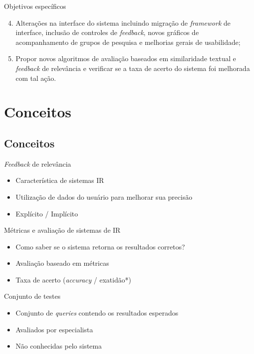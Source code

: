 \documentclass{beamer}
\begin{document}
\begin{frame}{Objetivos específicos}
  \begin{enumerate}[<+->]
    \setcounter{enumi}{3}

    \item Alterações na interface do sistema incluindo migração de \textit{framework} de interface, inclusão de controles de \textit{feedback}, novos gráficos de acompanhamento de grupos de pesquisa e melhorias gerais de usabilidade;

    \item Propor novos algoritmos de avaliação baseados em similaridade textual e \textit{feedback} de relevância e verificar se a taxa de acerto do sistema foi melhorada com tal ação.
  \end{enumerate}
\end{frame}

\section{Conceitos}
\subsection*{Conceitos}

\begin{frame}{\textit{Feedback} de relevância}
  \begin{itemize}
    \item Característica de sistemas IR
    \item Utilização de dados do usuário para melhorar sua precisão
    \item Explícito / Implícito
  \end{itemize}
\end{frame}

\begin{frame}{Métricas e avaliação de sistemas de IR}
  \begin{itemize}
    \item Como saber se o sistema retorna os resultados corretos?
    \item Avaliação baseado em métricas
    \item Taxa de acerto (\textit{accuracy} / exatidão*)
  \end{itemize}
\end{frame}

\begin{frame}{Conjunto de testes}
  \begin{itemize}
    \item Conjunto de \textit{queries} contendo os resultados esperados
    \item Avaliados por especialista
    \item Não conhecidas pelo sistema
  \end{itemize}
\end{frame}
\end{document}
